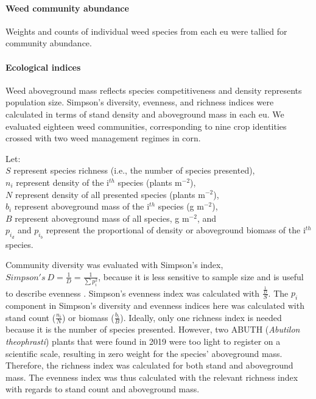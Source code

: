 \documentclass[
]{article}
\begin{document}
\hypertarget{weed-community-abundance}{%
\paragraph*{Weed community abundance}\label{weed-community-abundance}}

Weights and counts of individual weed species from each eu were tallied for community abundance.

\hypertarget{ecological-indices}{%
\paragraph*{Ecological indices}\label{ecological-indices}}

Weed aboveground mass reflects species competitiveness and density represents population size. Simpson's diversity, evenness, and richness indices were calculated in terms of stand density and aboveground mass in each eu. We evaluated eighteen weed communities, corresponding to nine crop identities crossed with two weed management regimes in corn.

Let:\\
\(S\) represent species richness (i.e., the number of species presented),\\
\(n_i\) represent density of the i\(^{th}\) species (plants m\(^{-2}\)),\\
\(N\) represent density of all presented species (plants m\(^{-2}\)),\\
\(b_i\) represent aboveground mass of the i\(^{th}\) species (g m\(^{-2}\)),\\
\(B\) represent aboveground mass of all species, g m\(^{-2}\), and\\
\(p_{i_d}\) and \(p_{i_b}\) represent the proportional of density or aboveground biomass of the i\(^{th}\) species.

Community diversity was evaluated with Simpson's index, \(Simpson's\ D = \frac{1}{D} = \frac{1}{\sum p_i^2}\), because it is less sensitive to sample size and is useful to describe evenness \citep{nkoaWeedAbundanceDistribution2015}. Simpson's evenness index was calculated with \(\frac{\frac{1}{D}}{S}\). The \(p_i\) component in Simpson's diversity and evenness indices here was calculated with stand count (\(\frac{n_i}{N}\)) or biomass (\(\frac{b_i}{B}\)). Ideally, only one richness index is needed because it is the number of species presented. However, two ABUTH (\emph{Abutilon theophrasti}) plants that were found in 2019 were too light to register on a scientific scale, resulting in zero weight for the species' aboveground mass. Therefore, the richness index was calculated for both stand and aboveground mass. The evenness index was thus calculated with the relevant richness index with regards to stand count and aboveground mass.
\end{document}
